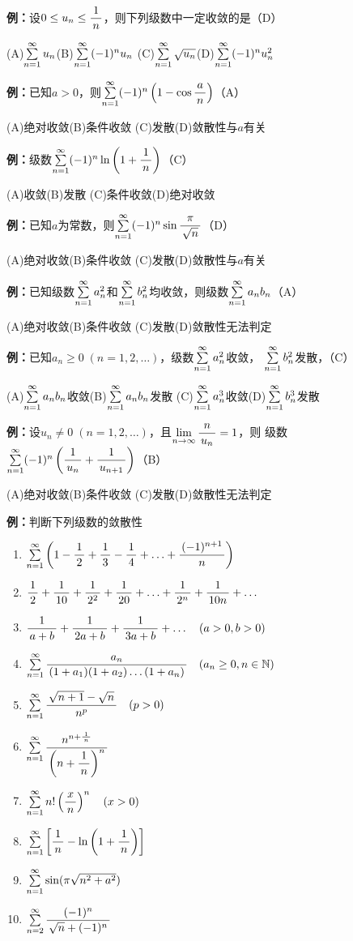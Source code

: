 {\bf 例：}设$0\leq u_n\leq \df1n$，则下列级数中一定收敛的是（D）

\quad (A)\;$\sumn u_n$\quad(B)\;$\sumn (-1)^n u_n$
\quad (C)\;$\sumn \sqrt{u_n}$\quad(D)\;$\sumn (-1)^nu_n^2$

{\bf 例：}已知$a>0$，则$\sumn(-1)^n\left(1-\cos\df an\right)$（A）

\quad (A)\;绝对收敛\quad(B)\;条件收敛
\quad (C)\;发散\quad(D)\;敛散性与$a$有关

{\bf 例：}级数$\sumn(-1)^n\ln\left(1+\df1n\right)$（C）

\quad (A)\;收敛\quad(B)\;发散
\quad (C)\;条件收敛\quad(D)\;绝对收敛

{\bf 例：}已知$a$为常数，则$\sumn(-1)^n\sin\df{\pi}{\sqrt n}$（D）

\quad (A)\;绝对收敛\quad(B)\;条件收敛
\quad (C)\;发散\quad(D)\;敛散性与$a$有关

{\bf 例：}已知级数$\sumn a_n^2$和$\sumn b_n^2$均收敛，则级数$\sumn a_nb_n$（A）

\quad (A)\;绝对收敛\quad(B)\;条件收敛
\quad (C)\;发散\quad(D)\;敛散性无法判定

{\bf 例：}已知$a_n\geq 0\;(n=1,2,\ldots)$，级数$\sumn a_n^2$收敛，
$\sumn b_n^2$发散，（C） 

\quad (A)\;$\sumn a_nb_n$收敛\quad(B)\;$\sumn a_nb_n$发散
\quad (C)\;$\sumn a_n^3$收敛\quad(D)\;$\sumn b_n^3$发散

{\bf 例：}设$u_n\ne0\;(n=1,2,\ldots)$，且$\limn\df n{u_n}=1$，则
级数$\sumn(-1)^n\left(\df1{u_n}+\df1{u_{n+1}}\right)$（B）

\quad (A)\;绝对收敛\quad(B)\;条件收敛
\quad (C)\;发散\quad(D)\;敛散性无法判定


{\bf 例：}判断下列级数的敛散性
\begin{enumerate}[(1)]
  \setlength{\itemindent}{1cm}
  \item $\sumn\left(1-\df12+\df13-\df14+\ldots+\df{(-1)^{n+1}}n\right)$
  \item $\df12+\df1{10}+\df1{2^2}+\df1{20}+\ldots+\df1{2^n}+\df1{10n}+\ldots$
  \item $\df 1{a+b}+\df 1{2a+b}+\df 1{3a+b}+\ldots\quad (a>0,b>0)$
  \item $\sumn\df {a_n}{(1+a_1)(1+a_2)\ldots(1+a_n)}\quad(a_n\geq
	  0,n\in\mathbb{N})$
  \item $\sumn\df{\sqrt{n+1}-\sqrt{n}}{n^p}\quad(p>0)$
  \item $\sumn\df{n^{n+\frac 1{\,n\,}}}{\left(n+\df 1n\right)^n}$
  \item $\sumn n!\left(\df{x}{n}\right)^n\quad (x>0)$
  \item $\sumn\left[\df 1n-\ln\left(1+\df 1n\right)\right]$
  \item $\sumn\sin(\pi\sqrt{n^2+a^2})$
  \item $\sum\limits_{n=2}^{\infty}\df{(-1)^n}{\sqrt n+(-1)^n}$
\end{enumerate}

